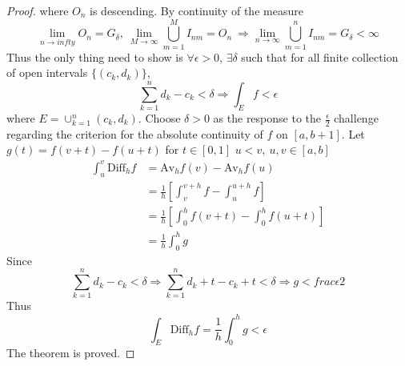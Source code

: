 \documentclass[lang=en, 12pt]{elegantbook}
\begin{document}
\begin{proof}
        where $O_n$ is descending. By continuity
        of the measure 
        $$\lim_{n\to infty} O_n = G_{\delta} , \ 
        \lim_{M\to \infty} \bigcup_{m=1}^M I_{nm} = O_n \ \Rightarrow 
        \lim_{n\to \infty} \bigcup_{m=1}^n I_{nm} = G_{\delta} < \infty$$
        Thus the only thing need to show is $\forall \epsilon > 0$, $\exists \delta$
        such that for all finite collection of open intervals
        $\{(c_k, d_k)\}$,
        \begin{equation}
            \sum_{k=1}^n d_k - c_k < \delta \Rightarrow 
            \int_E f < \epsilon
        \end{equation}
        where $E = \cup_{k=1}^n (c_k,d_k)$.
        Choose $\delta >0$ as the response to the $\frac{\epsilon}{2}$
        challenge regarding the criterion for the absolute continuity
        of $f$ on $[a, b+1]$. Let $g(t) = f(v+t) -f(u+t)$ for 
        $t \in [0,1]$ $u<v, \ u,v\in [a,b]$
        \begin{equation*}
            \begin{aligned}
                \int_u^v \mbox{Diff}_h f &= \mbox{Av}_hf(v) - \mbox{Av}_hf(u)\\
            &= \frac{1}{h}[ \int_v^{v+h} f  -\int_u^{u+h} f]\\
            &= \frac{1}{h}[ \int_0^{h} f(v+t)  -\int_0^{h} f(u+t)]\\
            &=\frac{1}{h} \int_0^{h} g
            \end{aligned}
        \end{equation*}
        Since $$\sum_{k=1}^n d_k- c_k <\delta \Rightarrow 
        \sum_{k=1}^n d_k+t - c_k +t<\delta
        \Rightarrow g < frac{\epsilon}{2}$$
        Thus 
        $$\int_E \mbox{Diff}_h f = \frac{1}{h} \int_0^{h} g < \epsilon $$
        The theorem is proved.
        \end{proof}
\end{document}
